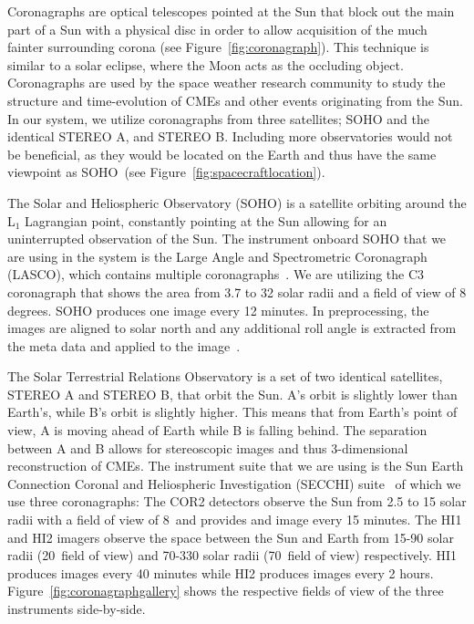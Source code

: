 \documentclass[journal]{vgtc}                %
\begin{document}
Coronagraphs are optical telescopes pointed at the Sun that block out the main part of a Sun with a physical disc in order to allow acquisition of the much fainter surrounding corona (see Figure~\ref{fig:coronagraph}). This technique is similar to a solar eclipse, where the Moon acts as the occluding object. Coronagraphs are used by the space weather research community to study the structure and time-evolution of CMEs and other events originating from the Sun. In our system, we utilize coronagraphs from three satellites; SOHO and the identical STEREO A, and STEREO B. Including more observatories would not be beneficial, as they would be located on the Earth and thus have the same viewpoint as SOHO~(see Figure~\ref{fig:spacecraftlocation}).

 The Solar and Heliospheric Observatory (SOHO) is a satellite orbiting around the L$_1$ Lagrangian point, constantly pointing at the Sun allowing for an uninterrupted observation of the Sun. The instrument onboard SOHO that we are using in the system is the Large Angle and Spectrometric Coronagraph (LASCO), which contains multiple coronagraphs~\cite{Brueckner:1995cb}. We are utilizing the C3 coronagraph that shows the area from 3.7 to 32 solar radii and a field of view of 8 degrees. SOHO produces one image every 12 minutes. In preprocessing, the images are aligned to solar north and any additional roll angle is extracted from the meta data and applied to the image~\cite{wells1981fits}.

 The Solar Terrestrial Relations Observatory is a set of two identical satellites, STEREO A and STEREO B, that orbit the Sun. A's orbit is slightly lower than Earth's, while B's orbit is slightly higher. This means that from Earth's point of view, A is moving ahead of Earth while B is falling behind. The separation between A and B allows for stereoscopic images and thus 3-dimensional reconstruction of CMEs. The instrument suite that we are using is the Sun Earth Connection Coronal and Heliospheric Investigation (SECCHI) suite~\cite{Socker:2000ic} of which we use three coronagraphs: The COR2 detectors observe the Sun from 2.5 to 15 solar radii with a field of view of 8\degree\ and provides and image every 15 minutes. The HI1 and HI2 imagers observe the space between the Sun and Earth from 15-90 solar radii (20\degree\ field of view) and 70-330 solar radii (70\degree\ field of view) respectively. HI1 produces images every 40 minutes while HI2 produces images every 2 hours. Figure~\ref{fig:coronagraphgallery} shows the respective fields of view of the three instruments side-by-side.
\end{document}
